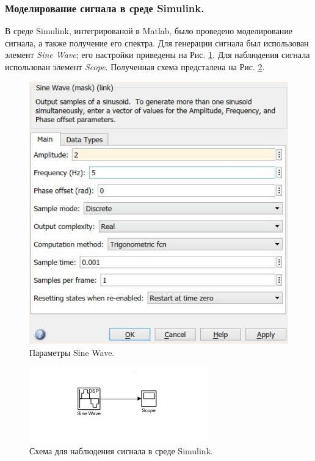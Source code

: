 \documentclass[a4paper,14pt]{extarticle}
\begin{document}
\subsubsection{Моделирование сигнала в среде Simulink.}
В среде Simulink, интегрированой в Matlab, было проведено моделирование сигнала, а также получение его спектра. Для генерации сигнала был использован элемент \textit{Sine Wave}; его настройки приведены на Рис. \ref{sine_wave}. Для наблюдения сигнала использован элемент \textit{Scope}. Полученная схема предсталена на Рис. \ref{scheme}.
\begin{figure}[H]
\centering
\includegraphics[scale=0.5]{pics/1simulink_params.jpg}
\caption{Параметры Sine Wave.}
\label{sine_wave}
\end{figure}
\begin{figure}[H]
\centering
\includegraphics[scale=1.2]{pics/1simulink_scheme.jpg}
\caption{Схема для наблюдения сигнала в среде Simulink.}
\label{scheme}
\end{figure}
\end{document}
